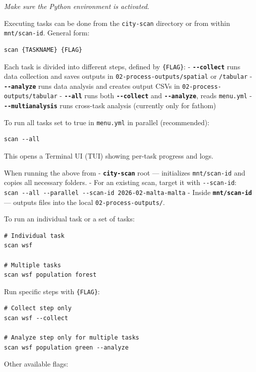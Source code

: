 \documentclass[
  letterpaper,
  DIV=11,
  numbers=noendperiod]{scrreprt}
\begin{document}
\emph{Make sure the Python environment is activated}.

Executing tasks can be done from the \texttt{city-scan} directory or
from within \texttt{mnt/scan-id}. General form:

\begin{verbatim}
scan {TASKNAME} {FLAG}
\end{verbatim}

Each task is divided into different steps, defined by \texttt{\{FLAG\}}:
- \textbf{\texttt{-\/-collect}} runs data collection and saves outputs
in \texttt{02-process-outputs/spatial} or \texttt{/tabular} -
\textbf{\texttt{-\/-analyze}} runs data analysis and creates output CSVs
in \texttt{02-process-outputs/tabular} - \textbf{\texttt{-\/-all}} runs
both \textbf{\texttt{-\/-collect}} and \textbf{\texttt{-\/-analyze}},
reads \texttt{menu.yml} - \textbf{\texttt{-\/-multianalysis}} runs
cross-task analysis (currently only for fathom)

To run all tasks set to true in \texttt{menu.yml} in parallel
(recommended):

\begin{verbatim}
scan --all 
\end{verbatim}

This opens a Terminal UI (TUI) showing per-task progress and logs.

When running the above from - \textbf{\texttt{city-scan}} root ---
initializes \texttt{mnt/scan-id} and copies all necessary folders. - For
an existing scan, target it with \texttt{-\/-scan-id}:
\texttt{scan\ -\/-all\ -\/-parallel\ -\/-scan-id\ 2026-02-malta-malta} -
Inside \textbf{\texttt{mnt/scan-id}} --- outputs files into the local
\texttt{02-process-outputs/}.

To run an individual task or a set of tasks:

\begin{verbatim}
# Individual task
scan wsf

# Multiple tasks
scan wsf population forest
\end{verbatim}

Run specific steps with \texttt{\{FLAG\}}:

\begin{verbatim}
# Collect step only
scan wsf --collect

# Analyze step only for multiple tasks
scan wsf population green --analyze
\end{verbatim}

Other available flags:
\end{document}
